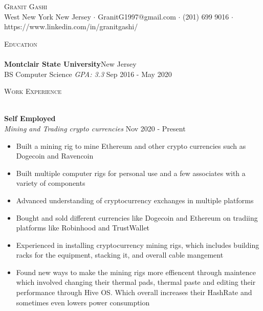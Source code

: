 \documentclass[a4paper]{article}
\newcommand{\lineunder} {
    \vspace*{-8pt} \\
    \hspace*{-18pt} \hrulefill \\
}
\newcommand{\header} [1] {
    {\hspace*{-18pt}\vspace*{6pt} \textsc{#1}}
    \vspace*{-6pt} \lineunder
}
\begin{document}
\vspace*{-40pt}

    

\vspace*{-10pt}
\begin{center}
	{\Huge \scshape {Granit Gashi}}\\
	West New York New Jersey $\cdot$ GranitG1997@gmail.com $\cdot$ (201) 699 9016 $\cdot$ https://www.linkedin.com/in/granitgashi/\\
\end{center}

\header{Education}
\textbf{Montclair State University}\hfill New Jersey\\
BS Computer Science \textit{GPA: 3.3} \hfill Sep 2016 - May 2020\\
\vspace{2mm}

\header{Work Experience}
\vspace{1mm}

\textbf{Self Employed}\\
\textit{Mining and Trading crypto currencies} \hfill Nov 2020 - Present\\
\vspace{-1mm}
\begin{itemize} \itemsep 1pt
	\item Built a mining rig to mine Ethereum and other crypto currencies such as Dogecoin and Ravencoin
	\item Built multiple computer rigs for personal use and a few associates with a variety of components
	\item Advanced understanding of cryptocurrency exchanges in multiple platforms
	\item Bought and sold different currencies like Dogecoin and Ethereum on tradiing platforms like Robinhood and TrustWallet
	\item Experienced in installing cryptocurrency mining rigs, which includes building racks for the equipment, stacking it, and overall cable mangement
	\item Found new ways to make the mining rigs more effiencent through maintence which involved changing their thermal pads, thermal paste and editing their performance through Hive OS. Which overall increases their HashRate and sometimes even lowers power consumption
\end{itemize}
\end{document}
